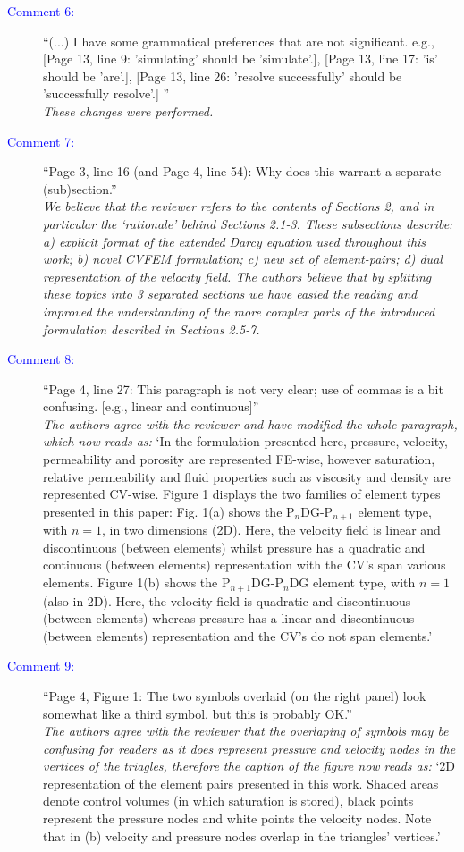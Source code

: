 \documentclass[12pts,a4paper,amsmath,amssymb,floatfix]{article}
\newcommand{\blue}{\textcolor{blue}}
\begin{document}
\begin{description}
\item[\blue{Comment 6:}] ``(...) I have some grammatical preferences that are not significant. e.g., [Page 13, line 9: 'simulating' should be 'simulate'.], [Page 13, line 17: 'is' should be 'are'.], [Page 13, line 26: 'resolve successfully' should be 'successfully resolve'.] ''\\
   {\it These changes were performed.}
\item[\blue{Comment 7:}] ``Page 3, line 16 (and Page 4, line 54): Why does this warrant a separate (sub)section.''\\
   {\it We believe that the reviewer refers to the contents of Sections 2, and in particular the `rationale' behind  Sections 2.1-3. These subsections describe: a) explicit format of the extended Darcy equation used throughout this work; b) novel CVFEM formulation; c) new set of element-pairs; d) dual representation of the velocity field. The authors believe that by splitting these topics into 3 separated sections we have easied the reading and improved the understanding of the more complex parts of the introduced formulation described in Sections 2.5-7.} 
\item[\blue{Comment 8:}] ``Page 4, line 27: This paragraph is not very clear; use of commas is a bit confusing. [e.g., linear and continuous]''\\
{\it The authors agree with the reviewer and have modified the whole paragraph, which now reads as:} `In the formulation presented here, pressure, velocity, permeability and porosity are represented FE-wise, however saturation, relative permeability and fluid properties such as viscosity and density are represented CV-wise. Figure 1 displays the two families of element types presented in this paper: Fig. 1(a) shows the P$_{n}$DG-P$_{n+1}$ element type, with $n = 1$, in two dimensions (2D). Here, the velocity field is linear and discontinuous (between elements) whilst pressure has a quadratic and continuous (between elements) representation with the CV's span various elements. Figure 1(b) shows the P$_{n+1}$DG-P$_{n}$DG element type, with $n = 1$ (also in 2D). Here, the velocity field is quadratic and discontinuous (between elements) whereas pressure has a linear and discontinuous (between elements) representation and the CV's do not span elements.'


\item[\blue{Comment 9:}] ``Page 4, Figure 1: The two symbols overlaid (on the right panel) look somewhat like a third symbol, but this is probably OK.''\\
{\it The authors agree with the reviewer that the overlaping of symbols may be confusing for readers as it does represent pressure and velocity nodes in the vertices of the triagles, therefore the caption of the figure now reads as:} `2D representation of the element pairs presented in this work. Shaded areas denote control volumes (in which saturation is   stored), black points represent the pressure nodes and white points the velocity nodes. Note that in (b) velocity and pressure nodes overlap in the triangles' vertices.'


\end{description}
\end{document}
